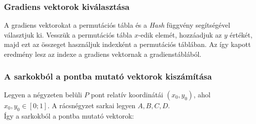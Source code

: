 \documentclass[12pt]{article}
\begin{document}
\subsubsection{Gradiens vektorok kiválasztása}
A gradiens vektorokat a permutációs tábla és a \textit{Hash} függvény
segítségével választjuk ki. Vesszük a permutációs tábla $x$-edik elemét,
hozzáadjuk az $y$ értékét, majd ezt az összeget használjuk indexként a
permutációs táblában. Az így kapott eredmény lesz az indexe a gradiens
vektornak a gradienstáblából.
\begin{algorithm}
    \linespread{0.75}\selectfont
    \caption{Gradiens vektor kiválasztása}
    \DontPrintSemicolon

    \;
\end{algorithm}
\subsubsection{A sarkokból a pontba mutató vektorok kiszámítása}
Legyen a négyzeten belüli $P$ pont relatív koordinátái $(x_{0}, y_{0})$, ahol
$x_{0}, y_{0} \in [0;1]$. A rácsnégyzet sarkai legyen $A, B, C, D$.\\ Így a
sarkokból a pontba mutató vektorok:
\end{document}
